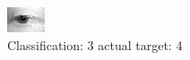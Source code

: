 \begin{figure}[h!]
\begin{center}
\includegraphics[width=0.60\columnwidth]{figures/ID2645_class_3_target_4.png}
\end{center}
\caption{ Classification: 3 actual target: 4}
\label{fig:ID2645_class_3_target_4}
\end{figure}
